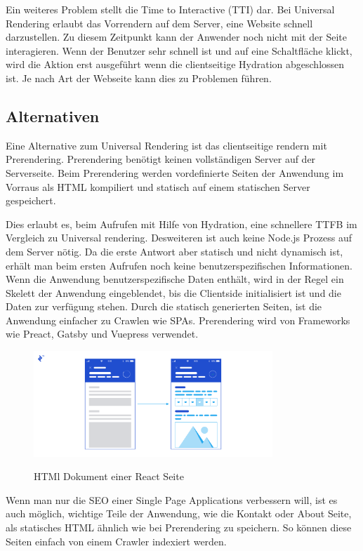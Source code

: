 \documentclass[runningheads]{llncs}
\begin{document}
Ein weiteres Problem stellt die Time to Interactive (TTI) dar. 
Bei Universal Rendering erlaubt das Vorrendern auf dem Server, 
eine Website schnell darzustellen. 
Zu diesem Zeitpunkt kann der Anwender noch nicht mit der Seite interagieren. 
Wenn der Benutzer sehr schnell ist und auf eine Schaltfläche klickt, 
wird die Aktion erst ausgeführt wenn die clientseitige Hydration abgeschlossen ist. 
Je nach Art der Webseite kann dies zu Problemen führen.


\subsection{Alternativen}
\label{subsec:Alternativen}
Eine Alternative zum Universal Rendering ist das clientseitige rendern mit Prerendering. 
Prerendering benötigt keinen vollständigen Server auf der Serverseite. 
Beim Prerendering werden vordefinierte Seiten der Anwendung im Vorraus als HTML kompiliert und 
statisch auf einem statischen Server gespeichert. 

Dies erlaubt es, beim Aufrufen mit Hilfe von Hydration, 
eine schnellere TTFB im Vergleich zu Universal rendering. 
Desweiteren ist auch keine Node.js Prozess auf dem Server nötig. 
Da die erste Antwort aber statisch und nicht dynamisch ist, 
erhält man beim ersten Aufrufen noch keine benutzerspezifischen Informationen. 
Wenn die Anwendung benutzerspezifische Daten enthält, 
wird in der Regel ein Skelett der Anwendung eingeblendet, 
bis die Clientside initialisiert ist und die Daten zur verfügung stehen. 
Durch die statisch generierten Seiten, 
ist die Anwendung einfacher zu Crawlen wie SPAs. 
Prerendering wird von Frameworks wie Preact, 
Gatsby und Vuepress verwendet.

\begin{figure}[h]
  \centering
  \includegraphics[width=9cm]{images/WebsiteSceleton}
  \caption{HTMl Dokument einer React Seite}
  \cite{breux_2018}
\end{figure}

Wenn man nur die SEO einer Single Page Applications verbessern will, 
ist es auch möglich, 
wichtige Teile der Anwendung, 
wie die Kontakt oder About Seite, 
als statisches HTML ähnlich wie bei Prerendering zu speichern. 
So können diese Seiten einfach von einem Crawler indexiert werden.
\end{document}
